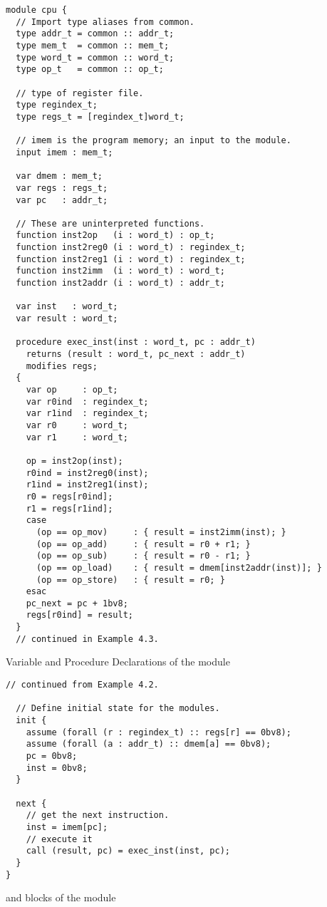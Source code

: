 \begin{uclidlisting}[htbp]
\begin{lstlisting}[language=uclid,style=uclidstyle]
module cpu {
  // Import type aliases from common.
  type addr_t = common :: addr_t;
  type mem_t  = common :: mem_t;
  type word_t = common :: word_t;
  type op_t   = common :: op_t;
  
  // type of register file.
  type regindex_t; 
  type regs_t = [regindex_t]word_t;

  // imem is the program memory; an input to the module.
  input imem : mem_t;
  
  var dmem : mem_t;
  var regs : regs_t;
  var pc   : addr_t;

  // These are uninterpreted functions.
  function inst2op   (i : word_t) : op_t;
  function inst2reg0 (i : word_t) : regindex_t;
  function inst2reg1 (i : word_t) : regindex_t;
  function inst2imm  (i : word_t) : word_t;
  function inst2addr (i : word_t) : addr_t;

  var inst   : word_t;
  var result : word_t;

  procedure exec_inst(inst : word_t, pc : addr_t)
    returns (result : word_t, pc_next : addr_t)
    modifies regs;
  {
    var op     : op_t;
    var r0ind  : regindex_t;
    var r1ind  : regindex_t;
    var r0     : word_t;
    var r1     : word_t;

    op = inst2op(inst);
    r0ind = inst2reg0(inst);
    r1ind = inst2reg1(inst);
    r0 = regs[r0ind];
    r1 = regs[r1ind];
    case
      (op == op_mov)     : { result = inst2imm(inst); }
      (op == op_add)     : { result = r0 + r1; }
      (op == op_sub)     : { result = r0 - r1; }
      (op == op_load)    : { result = dmem[inst2addr(inst)]; }
      (op == op_store)   : { result = r0; }
    esac
    pc_next = pc + 1bv8;
    regs[r0ind] = result;
  }
  // continued in Example 4.3.
\end{lstlisting}
\caption{Variable and Procedure Declarations of the  module}
\label{ex:cpu-cpu-p1}
\end{uclidlisting}

\begin{uclidlisting}[htbp]
\begin{lstlisting}[language=uclid,style=uclidstyle]
  // continued from Example 4.2.

  // Define initial state for the modules.
  init {
    assume (forall (r : regindex_t) :: regs[r] == 0bv8);
    assume (forall (a : addr_t) :: dmem[a] == 0bv8);
    pc = 0bv8;
    inst = 0bv8;
  }

  next {
    // get the next instruction.
    inst = imem[pc];
    // execute it
    call (result, pc) = exec_inst(inst, pc);
  }
}
\end{lstlisting}
\caption{ and  blocks of the  module}
\label{ex:cpu-cpu-p2}
\end{uclidlisting}

